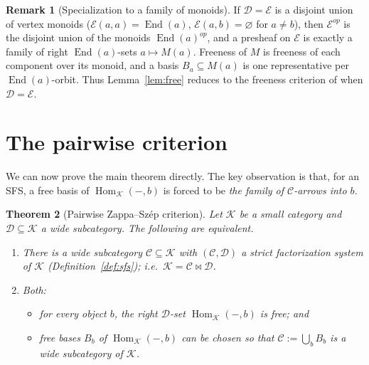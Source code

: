 \documentclass[11pt]{article}
\newtheorem{theorem}{Theorem}
\theoremstyle{definition}
\newtheorem{remark}[theorem]{Remark}
\newcommand{\Hom}{\operatorname{Hom}}
\newcommand{\End}{\operatorname{End}}
\newcommand{\C}{\mathcal{C}}
\newcommand{\D}{\mathcal{D}}
\newcommand{\K}{\mathcal{K}}
\newcommand{\E}{\mathcal{E}}
\begin{document}
\begin{remark}[Specialization to a family of monoids]\label{rem:monoids}
If $\D=\E$ is a disjoint union of vertex monoids ($\E(a,a)=\End(a)$,
$\E(a,b)=\varnothing$ for $a\neq b$), then $\E^{op}$ is the disjoint union of the
monoids $\End(a)^{op}$, and a presheaf on $\E$ is exactly a family of right
$\End(a)$-sets $a\mapsto M(a)$. Freeness of $M$ is freeness of each component over
its monoid, and a basis $B_a\subseteq M(a)$ is one representative per
$\End(a)$-orbit. Thus Lemma~\ref{lem:free} reduces to the freeness criterion of
\cite{single} when $\D=\E$.
\end{remark}

\section{The pairwise criterion}

We can now prove the main theorem directly. The key observation is that, for an
SFS, a free basis of $\Hom_\K(-,b)$ is forced to be \emph{the family of
$\C$-arrows into $b$}.

\begin{theorem}[Pairwise Zappa--Sz\'ep criterion]\label{thm:criterion}
Let $\K$ be a small category and $\D\subseteq\K$ a wide subcategory. The following
are equivalent.
\begin{enumerate}
\item There is a wide subcategory $\C\subseteq\K$ with $(\C,\D)$ a strict
factorization system of $\K$ (Definition~\ref{def:sfs}); i.e.\ $\K=\C\bowtie\D$.
\item Both:
\begin{itemize}
\item[\textnormal{(L)}] for every object $b$, the right $\D$-set $\Hom_\K(-,b)$
is free; and
\item[\textnormal{(G)}] free bases $B_b$ of $\Hom_\K(-,b)$ can be chosen so that
$\C:=\bigcup_{b}B_b$ is a wide subcategory of $\K$.
\end{itemize}
\end{enumerate}
\end{theorem}
\end{document}
